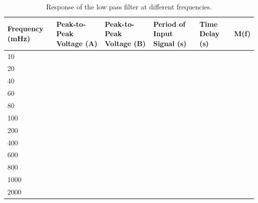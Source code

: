\documentclass{article} %
\begin{document}
\begin{table}[H]
\centering
\caption{Response of the low pass filter at different frequencies.}
\label{Table1}
\begin{tabular}{|p{2.00cm}|p{2.00cm}|p{2.00cm}|p{2.00cm}|p{2.00cm}|p{2.00cm}|}
\hline
Frequency (mHz) & Peak-to-Peak Voltage (A) & Peak-to-Peak Voltage (B) & Period of Input Signal (s) & Time Delay (s)& M(f) \\ \hline
10              &                          &                          &                            &              &  \\ \hline
20              &                          &                          &                            &               & \\ \hline
40              &                          &                          &                            &                &\\ \hline
60              &                          &                          &                            &                &\\ \hline
80              &                          &                          &                            &                &\\ \hline
100             &                          &                          &                            &                &\\ \hline
200             &                          &                          &                            &                &\\ \hline
400             &                          &                          &                            &                &\\ \hline
600             &                          &                          &                            &                &\\ \hline
800             &                          &                          &                            &                &\\ \hline
1000            &                          &                          &                            &                &\\ \hline
2000            &                          &                          &                            &                &\\ \hline
\end{tabular}
\end{table}
\end{document}
